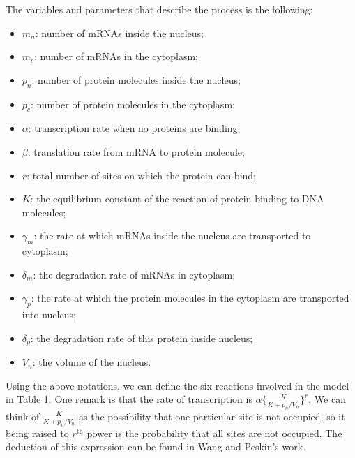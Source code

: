 \documentclass[12pt]{article}
\renewcommand{\(}{\left (}
\renewcommand{\)}{\right )}
\begin{document}
The variables and parameters that describe the process is the following:
\begin{itemize}
  \item $m_n$: number of mRNAs inside the nucleus;
  \item $m_c$: number of mRNAs in the cytoplasm;
  \item $p_n$: number of protein molecules inside the nucleus;
  \item $p_c$: number of protein molecules in the cytoplasm;
  \item $\alpha$: transcription rate when no proteins are binding;
  \item $\beta$: translation rate from mRNA to protein molecule;
  \item $r$: total number of sites on which the protein can bind;
  \item $K$: the equilibrium constant of the reaction of protein binding to DNA molecules;
  \item $\gamma_m$: the rate at which mRNAs inside the nucleus are transported to cytoplasm;
  \item $\delta_m$: the degradation rate of mRNAs in cytoplasm;
  \item $\gamma_p$: the rate at which the protein molecules in the cytoplasm are transported into nucleus;
  \item $\delta_p$: the degradation rate of this protein inside nucleus;
	\item $V_n$: the volume of the nucleus.
\end{itemize}

Using the above notations, we can define the six reactions involved in the model in Table 1. One remark is that the rate of transcription is $\alpha \{\frac{K}{K + p_n / V_n}\}^r.$ We can think of $\frac{K}{K + p_n / V_n}$ as the possibility that one particular site is not occupied, so it being raised to $r^\text{th}$ power is the probability that all sites are not occupied. The deduction of this expression can be found in Wang and Peskin's work.
\end{document}
